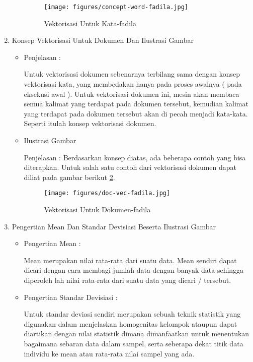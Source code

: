 \begin{enumerate}
\begin{itemize}
\begin{figure}[!hbtp]
\texttt{[image: figures/concept-word-fadila.jpg]}
\caption{Vektorisasi Untuk Kata-fadila}
\label{Vektorisasi Untuk Kata-fadila}
\end{figure}
\par
\end{itemize}
\par
\par
\item Konsep Vektorisasi Untuk Dokumen Dan Ilustrasi Gambar
\begin{itemize}
\item  Penjelasan :
\par Untuk vektorisasi dokumen sebenarnya terbilang sama dengan konsep vektorisasi kata, yang membedakan hanya pada proses awalnya ( pada eksekusi awal ). Untuk vektorisasi dokumen ini, mesin akan membaca semua kalimat yang terdapat pada dokumen tersebut, kemudian kalimat yang terdapat pada dokumen tersebut akan di pecah menjadi kata-kata. Seperti itulah konsep vektorisasi dokumen.
\par
\item Ilustrasi Gambar
\par Penjelasan : Berdasarkan konsep diatas, ada beberapa contoh yang bisa diterapkan. Untuk salah satu contoh dari vektorisasi dokumen dapat diliat pada gambar berikut \ref{Vektorisasi Untuk Dokumen-fadila}.
\begin{figure}[!hbtp]
\centering
\texttt{[image: figures/doc-vec-fadila.jpg]}
\caption{Vektorisasi Untuk Dokumen-fadila}
\label{Vektorisasi Untuk Dokumen-fadila}
\end{figure}
\par
\end{itemize}
\par
\par
\item Pengertian Mean Dan Standar Devisiasi Beserta Ilustrasi Gambar
\begin{itemize}
\item  Pengertian Mean :
\par Mean merupakan nilai rata-rata dari suatu data. Mean sendiri dapat dicari dengan cara membagi jumlah data dengan banyak data sehingga diperoleh lah nilai rata-rata dari suatu data yang dicari / tersebut. 
\par
\par
\item  Pengertian Standar Devisiasi :
\par Untuk standar deviasi sendiri merupakan sebuah teknik statistik yang digunakan dalam menjelaskan homogenitas kelompok ataupun dapat diartikan dengan nilai statistik dimana dimanfaatkan untuk menentukan bagaimana sebaran data dalam sampel, serta seberapa dekat titik data individu ke mean atau rata-rata nilai sampel yang ada. 

\end{itemize}
\end{enumerate}
